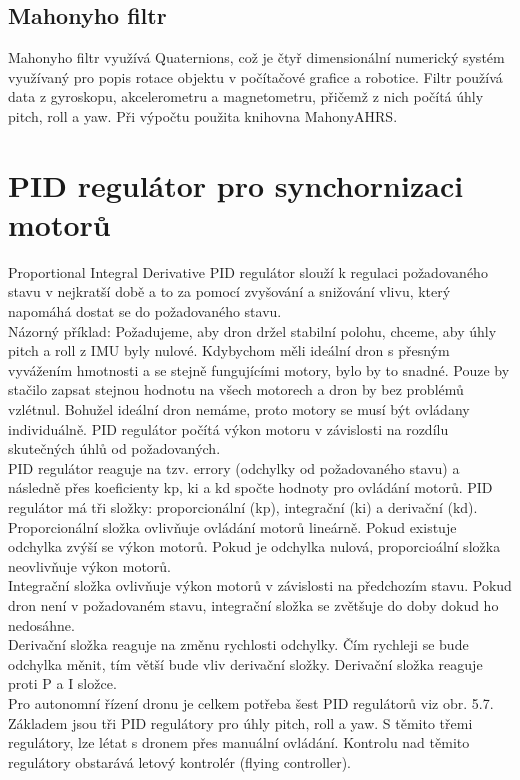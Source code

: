 \subsection{Mahonyho filtr}
Mahonyho filtr využívá Quaternions, což je čtyř dimensionální numerický systém využívaný pro popis rotace objektu v počítačové grafice a robotice. Filtr používá data z gyroskopu, akcelerometru a magnetometru, přičemž z nich počítá úhly pitch, roll a yaw. Při výpočtu použita knihovna MahonyAHRS. \cite{mahony}\\

\section{PID regulátor pro synchornizaci motorů} 
Proportional Integral Derivative
PID regulátor slouží k regulaci požadovaného stavu v nejkratší době a to za pomocí zvyšování a snižování vlivu, který napomáhá dostat se do požadovaného stavu.\\
Názorný příklad:
Požadujeme, aby dron držel stabilní polohu, chceme, aby úhly pitch a roll z IMU byly nulové. Kdybychom měli ideální dron s přesným vyvážením hmotnosti a se stejně fungujícími motory, bylo by to snadné. Pouze by stačilo zapsat stejnou hodnotu na všech motorech a dron by bez problémů vzlétnul. Bohužel ideální dron nemáme, proto motory se musí být ovládany individuálně. PID regulátor počítá výkon motoru v závislosti na rozdílu skutečných úhlů od požadovaných.\\
PID regulátor reaguje na tzv. errory (odchylky od požadovaného stavu) a následně přes koeficienty kp, ki a kd spočte hodnoty pro ovládání motorů.
PID regulátor má tři složky: proporcionální (kp), integrační (ki) a derivační (kd).\\
Proporcionální složka ovlivňuje ovládání motorů lineárně. Pokud existuje odchylka zvýší se výkon motorů. Pokud je odchylka nulová, proporcioální složka neovlivňuje výkon motorů.\\
Integrační složka ovlivňuje výkon motorů v závislosti na předchozím stavu. Pokud dron není v požadovaném stavu, integrační složka se zvětšuje do doby dokud ho nedosáhne.\\
Derivační složka reaguje na změnu rychlosti odchylky. Čím rychleji se bude odchylka měnit, tím větší bude vliv derivační složky. Derivační složka reaguje proti P a I složce.\\
Pro autonomní řízení dronu je celkem potřeba šest PID regulátorů viz obr. 5.7. Základem jsou tři PID regulátory pro úhly pitch, roll a yaw. S těmito třemi regulátory, lze létat s dronem přes manuální ovládání. Kontrolu  nad těmito regulátory obstarává letový kontrolér (flying controller).\\
